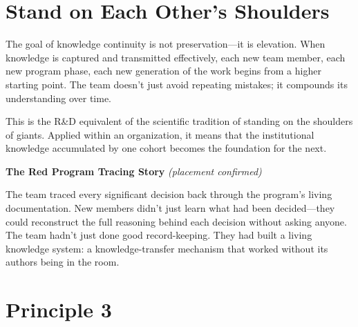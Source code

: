 \section{Stand on Each Other's Shoulders}


The goal of knowledge continuity is not preservation---it is elevation.
When knowledge is captured and transmitted effectively, each new team member,
each new program phase, each new generation of the work begins from a higher
starting point. The team doesn't just avoid repeating mistakes; it compounds
its understanding over time.

This is the R\&D equivalent of the scientific tradition of standing on the
shoulders of giants. Applied within an organization, it means that the
institutional knowledge accumulated by one cohort becomes the foundation
for the next.

\begin{storybox}
\textbf{The Red Program Tracing Story} \textit{(placement confirmed)}

The team traced every significant decision back through the program's living
documentation. New members didn't just learn what had been decided---they
could reconstruct the full reasoning behind each decision without asking
anyone. The team hadn't just done good record-keeping. They had built a
living knowledge system: a knowledge-transfer mechanism that worked without
its authors being in the room.

\end{storybox}

\section{Principle 3}



